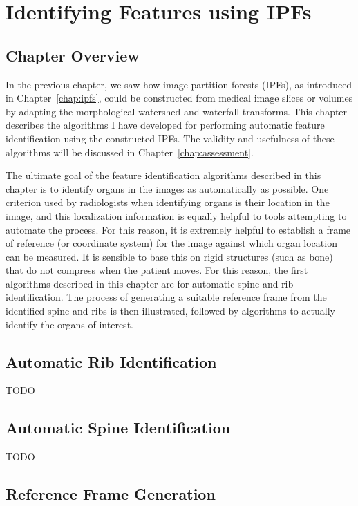 \chapter{Identifying Features using IPFs}
\label{chap:featureid}

\section{Chapter Overview}

In the previous chapter, we saw how image partition forests (IPFs), as introduced in Chapter~\ref{chap:ipfs}, could be constructed from medical image slices or volumes by adapting the morphological watershed and waterfall transforms. This chapter describes the algorithms I have developed for performing automatic feature identification using the constructed IPFs. The validity and usefulness of these algorithms will be discussed in Chapter~\ref{chap:assessment}.

The ultimate goal of the feature identification algorithms described in this chapter is to identify organs in the images as automatically as possible. One criterion used by radiologists \cite{?} when identifying organs is their location in the image, and this localization information is equally helpful to tools attempting to automate the process. For this reason, it is extremely helpful to establish a frame of reference (or coordinate system) for the image against which organ location can be measured. It is sensible to base this on rigid structures (such as bone) that do not compress when the patient moves. For this reason, the first algorithms described in this chapter are for automatic spine and rib identification. The process of generating a suitable reference frame from the identified spine and ribs is then illustrated, followed by algorithms to actually identify the organs of interest.

\section{Automatic Rib Identification}

TODO

\section{Automatic Spine Identification}

TODO

\section{Reference Frame Generation}

